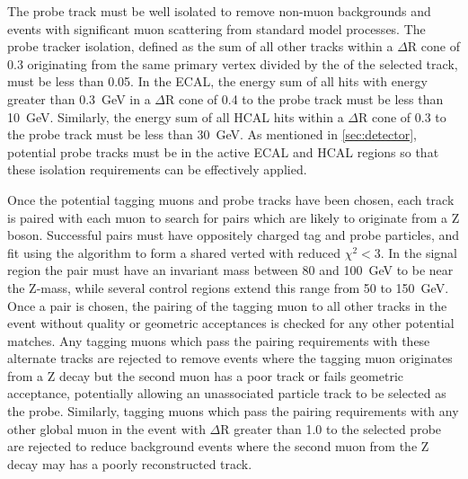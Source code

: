 The probe track must be well isolated to remove non-muon backgrounds and events with significant muon scattering from standard model processes. 
The probe tracker isolation, defined as the \pt sum of all other tracks within a $\Delta$R cone of 0.3 originating from the same primary vertex divided by the \pt of the selected track, must be less than 0.05.
In the ECAL, the energy sum of all hits with energy greater than \SI{0.3}{\giga\eV} in a $\Delta$R cone of 0.4 to the probe track must be less than \SI{10}{\giga\eV}.
Similarly, the energy sum of all HCAL hits within a $\Delta$R cone of 0.3 to the probe track must be less than \SI{30}{\giga\eV}. 
As mentioned in \cref{sec:detector}, potential probe tracks must be in the active ECAL and HCAL regions so that these isolation requirements can be effectively applied.

Once the potential tagging muons and probe tracks have been chosen, each track is paired with each muon to search for pairs which are likely to originate from a Z boson.
Successful pairs must have oppositely charged tag and probe particles, and fit using the \kf algorithm to form a shared verted with reduced $\chi^2<$3.
In the signal region the pair must have an invariant mass between 80 and \SI{100}{\giga\eV} to be near the Z-mass, while several control regions extend this range from 50 to \SI{150}{\giga\eV}.
Once a pair is chosen, the pairing of the tagging muon to all other tracks in the event without quality or geometric acceptances is checked for any other potential matches.
Any tagging muons which pass the pairing requirements with these alternate tracks are rejected to remove events where the tagging muon originates from a Z decay but the second muon has a poor track or fails geometric acceptance, potentially allowing an unassociated particle track to be selected as the probe.
Similarly, tagging muons which pass the pairing requirements with any other global muon in the event with $\Delta$R greater than 1.0 to the selected probe are rejected to reduce background events where the second muon from the Z decay may has a poorly reconstructed track.


